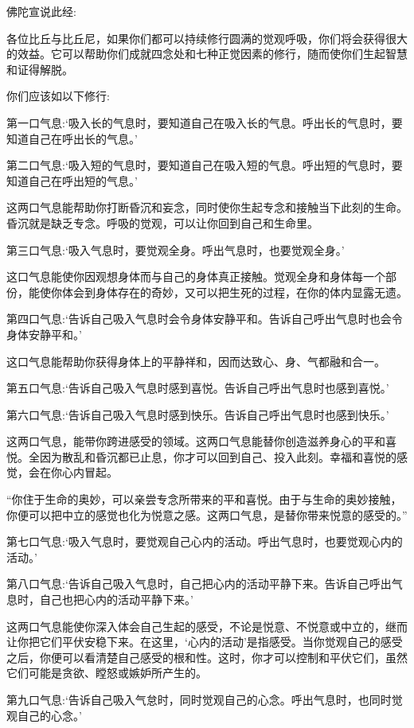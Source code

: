 \documentclass[12pt,twoside,openany]{book}
\begin{document}
佛陀宣说此经:

各位比丘与比丘尼，如果你们都可以持续修行圆满的觉观呼吸，你们将会获得很大的效益。它可以帮助你们成就四念处和七种正觉因素的修行，随而使你们生起智慧和证得解脱。

你们应该如以下修行:

第一口气息:‘吸入长的气息时，要知道自己在吸入长的气息。呼出长的气息时，要知道自己在呼出长的气息。’

第二口气息:‘吸入短的气息时，要知道自己在吸入短的气息。呼出短的气息时，要知道自己在呼出短的气息。’

这两口气息能帮助你打断昏沉和妄念，同时使你生起专念和接触当下此刻的生命。昏沉就是缺乏专念。呼吸的觉观，可以让你回到自己和生命里。

第三口气息:‘吸入气息时，要觉观全身。呼出气息时，也要觉观全身。’

这口气息能使你因观想身体而与自己的身体真正接触。觉观全身和身体每一个部份，能使你体会到身体存在的奇妙，又可以把生死的过程，在你的体内显露无遗。

第四口气息:‘告诉自己吸入气息时会令身体安静平和。告诉自己呼出气息时也会令身体安静平和。’

这口气息能帮助你获得身体上的平静祥和，因而达致心、身、气都融和合一。

第五口气息:‘告诉自己吸入气息时感到喜悦。告诉自己呼出气息时也感到喜悦。’

第六口气息:‘告诉自己吸入气息时感到怏乐。告诉自己呼出气息时也感到快乐。’

这两口气息，能带你跨进感受的领域。这两口气息能替你创造滋养身心的平和喜悦。全因为散乱和昏沉都已止息，你才可以回到自己、投入此刻。幸福和喜悦的感觉，会在你心内冒起。

“你住于生命的奥妙，可以亲尝专念所带来的平和喜悦。由于与生命的奥妙接触，你便可以把中立的感觉也化为悦意之感。这两口气息，是替你带来悦意的感受的。”

第七口气息:‘吸入气息时，要觉观自己心内的活动。呼出气息时，也要觉观心内的活动。’

第八口气息:‘告诉自己吸入气息时，自己把心内的活动平静下来。告诉自己呼出气息时，自己也把心内的活动平静下来。’

这两口气息能使你深入体会自己生起的感受，不论是悦意、不悦意或中立的，继而让你把它们平伏安稳下来。在这里，‘心内的活动’是指感受。当你觉观自己的感受之后，你便可以看清楚自己感受的根和性。这时，你才可以控制和平伏它们，虽然它们可能是贪欲、瞠怒或嫉妒所产生的。

第九口气息:‘告诉自己吸入气怠时，同时觉观自己的心念。呼出气息时，也同时觉观自己的心念。’
\end{document}
